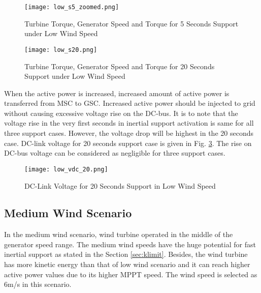 \begin{figure}[h!]
	\centering
	\texttt{[image: low\_s5\_zoomed.png]}
	\caption{Turbine Torque, Generator Speed and Torque for 5 Seconds Support under Low Wind Speed}
	\label{low_torques}
\end{figure}
\begin{figure}[h!]
	\centering
	\texttt{[image: low\_s20.png]}
	\caption{Turbine Torque, Generator Speed and Torque for 20 Seconds Support under Low Wind Speed}
	\label{low_torques3}
\end{figure}
When the active power is increased, increased amount of active power is transferred from MSC to GSC. Increased active power should be injected to grid without causing excessive voltage rise on the DC-bus. It is to note that the voltage rise in the very first seconds in inertial support activation is same for all three support cases. However, the voltage drop will be highest in the 20 seconds case. DC-link voltage for 20 seconds support case is given in Fig. \ref{low_vdc_s20}. The rise on DC-bus voltage can be considered as negligible for three support cases.
\begin{figure}[h!]
	\centering
	\texttt{[image: low\_vdc\_20.png]}
	\caption{DC-Link Voltage for 20 Seconds Support in Low Wind Speed}
	\label{low_vdc_s20}
\end{figure}
\subsection{Medium Wind Scenario}
In the medium wind scenario, wind turbine operated in the middle of the generator speed range. The medium wind speeds have the huge potential for fast inertial support as stated in the Section \ref{sec:klimit}. Besides, the wind turbine has more kinetic energy than that of low wind scenario and it can reach higher active power values due to its higher MPPT speed. The wind speed is selected as 6m/s in this scenario. 
